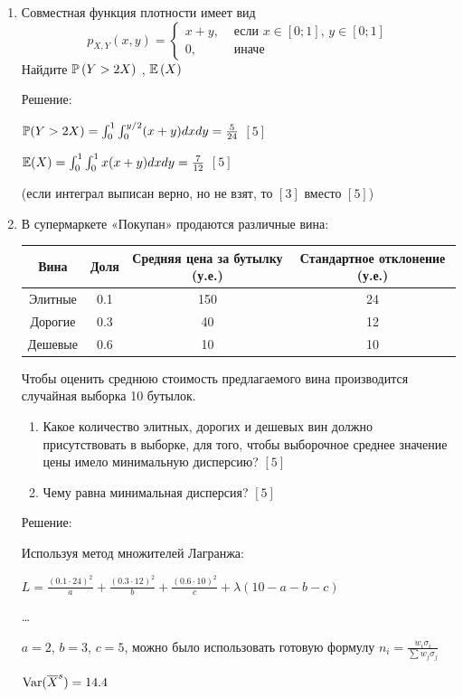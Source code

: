 \documentclass[12pt, a4paper]{article}\usepackage[]{graphicx}\usepackage[]{color}
\begin{document}
\begin{enumerate}
\item Совместная функция плотности имеет вид
\[
p_{X,Y} \left(x,y\right)=
\begin{cases}
x+y, & \text{ если } x\in \left[0;1\right],\, y\in \left[0;1\right] \\
0, & \text{ иначе}
\end{cases}
\]
Найдите  $\P\left(Y>2X\right)$ ,  $\E\left(X\right)$

Решение:

$\P(Y>2X)=\int_{0}^{1}\int_{0}^{y/2}(x+y)dxdy=\frac{5}{24}$ $[5]$

$\E(X)=\int_{0}^{1}\int_{0}^{1}x(x+y)dxdy=\frac{7}{12}$ $[5]$

(если интеграл выписан верно, но не взят, то $[3]$ вместо $[5]$)

\item В супермаркете «Покупан» продаются различные вина:

\begin{tabular}{|c|c|c|c|}
  \hline
  Вина & Доля & Средняя цена за бутылку (у.е.) & Стандартное отклонение (у.е.) \\
  \hline
  Элитные & 0.1 & 150 & 24 \\
  Дорогие & 0.3 & 40 & 12 \\
  Дешевые & 0.6 & 10 & 10 \\
  \hline
\end{tabular}

Чтобы оценить среднюю стоимость предлагаемого вина производится
случайная выборка 10 бутылок.
\begin{enumerate}
\item Какое количество элитных, дорогих и дешевых вин должно
присутствовать в выборке, для того, чтобы выборочное среднее
значение цены имело минимальную дисперсию? $[5]$
\item Чему равна минимальная дисперсия? $[5]$
\end{enumerate}
Решение:

Используя метод множителей Лагранжа:

$L=\frac{(0.1\cdot 24)^{2}}{a}+\frac{(0.3\cdot
12)^{2}}{b}+\frac{(0.6\cdot 10)^{2}}{c}+\lambda(10-a-b-c)$

\ldots

$a=2$, $b=3$, $c=5$, можно было использовать готовую формулу
$n_{i}=\frac{w_{i}\sigma_{i}}{\sum w_{j}\sigma_{j}}$

$\Var(\overline{X}^{s})=14.4$


\end{enumerate}
\end{document}

